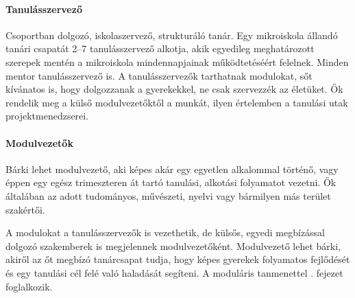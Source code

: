 \paragraph{Tanulásszervező}
Csoportban dolgozó, iskolaszervező, strukturáló tanár. Egy mikroiskola
állandó tanári
csapatát 2--7 tanulásszervező alkotja, akik egyedileg meghatározott szerepek
mentén a mikroiskola mindennapjainak működtetéséért felelnek. Minden mentor
tanulásszervező is. A tanulásszervezők tarthatnak
modulokat, sőt kívánatos is, hogy dolgozzanak a gyerekekkel, ne csak
szervezzék az életüket.
Ők rendelik meg a külső modulvezetőktől a munkát, ilyen értelemben a
tanulási utak projektmenedzserei.

\paragraph{Modulvezetők}

Bárki lehet modulvezető, aki képes akár egy egyetlen alkalommal történő, vagy
éppen
egy egész trimeszteren át tartó tanulási, alkotási folyamatot vezetni. Ők
általában
az adott tudományos, művészeti, nyelvi vagy bármilyen más terület szakértői.

A modulokat a tanulásszervezők is vezethetik, de külsős, egyedi megbízással
dolgozó szakemberek is megjelennek modulvezetőként. Modulvezető lehet bárki,
akiről az őt megbízó tanárcsapat tudja, hogy képes gyerekek folyamatos
fejlődését és egy tanulási cél felé való haladását segíteni. A moduláris
tanmenettel . fejezet foglalkozik.